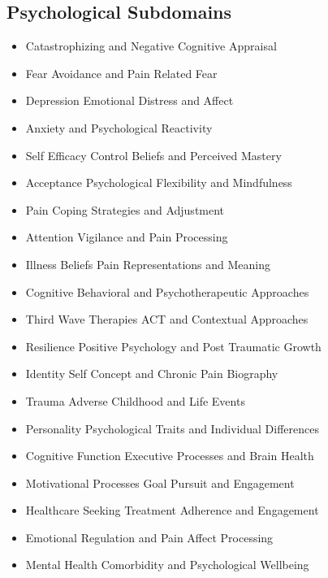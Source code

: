 \documentclass[11pt]{article}
\begin{document}
\subsection*{Psychological Subdomains}
\begin{itemize}
\item Catastrophizing and Negative Cognitive Appraisal
\item Fear Avoidance and Pain Related Fear
\item Depression Emotional Distress and Affect
\item Anxiety and Psychological Reactivity
\item Self Efficacy Control Beliefs and Perceived Mastery
\item Acceptance Psychological Flexibility and Mindfulness
\item Pain Coping Strategies and Adjustment
\item Attention Vigilance and Pain Processing
\item Illness Beliefs Pain Representations and Meaning
\item Cognitive Behavioral and Psychotherapeutic Approaches
\item Third Wave Therapies ACT and Contextual Approaches
\item Resilience Positive Psychology and Post Traumatic Growth
\item Identity Self Concept and Chronic Pain Biography
\item Trauma Adverse Childhood and Life Events
\item Personality Psychological Traits and Individual Differences
\item Cognitive Function Executive Processes and Brain Health
\item Motivational Processes Goal Pursuit and Engagement
\item Healthcare Seeking Treatment Adherence and Engagement
\item Emotional Regulation and Pain Affect Processing
\item Mental Health Comorbidity and Psychological Wellbeing
\end{itemize}
\end{document}
